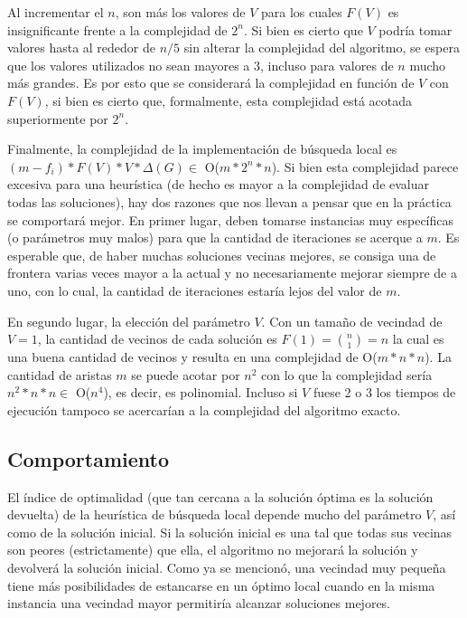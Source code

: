 \par{Al incrementar el $n$, son más los valores de $V$ para los cuales $F(V)$
es insignificante frente a la complejidad de $2^n$. Si bien es cierto que $V$
podría tomar valores hasta al rededor de $n/5$ sin alterar la complejidad del
algoritmo, se espera que los valores utilizados no sean mayores a $3$,
incluso para valores de $n$ mucho más grandes. Es por esto que se considerará
la complejidad en función de $V$ con $F(V)$, si bien es cierto que, formalmente,
esta complejidad está acotada superiormente por $2^n$.}\\
 
\par{Finalmente, la complejidad de la implementación de búsqueda local es\\
$(m-f_i) * F(V) * V*\Delta(G) \in$ O($m*2^n*n$). Si bien esta
complejidad parece excesiva para una heurística (de hecho es mayor a la
complejidad de evaluar todas las soluciones), hay dos razones que nos llevan a
pensar que en la práctica se comportará mejor. En primer lugar, deben tomarse
instancias muy específicas (o parámetros muy malos) para que la cantidad de
iteraciones se acerque a $m$. Es esperable que, de haber muchas soluciones
vecinas mejores, se consiga una de frontera varias
veces mayor a la actual y no necesariamente mejorar siempre de a uno, con
lo cual, la cantidad de iteraciones estaría lejos del valor de $m$.}\\

\par{En segundo lugar, la elección del parámetro $V$.
Con un tamaño de vecindad de $V = 1$, la cantidad de vecinos de cada solución es
$F(1) = \binom{n}{1} = n$ la cual es una buena cantidad de vecinos y
resulta en una complejidad de O($m*n*n$). La cantidad de aristas $m$ se puede
acotar por $n^2$ con lo que la complejidad sería $n^2 * n * n \in$
O($n^4$), es decir, es polinomial. Incluso si $V$ fuese 2 o 3 los tiempos
de ejecución tampoco se acercarían a la complejidad del algoritmo exacto.}

\subsection{Comportamiento}

\par{El índice de optimalidad (que tan cercana a la solución óptima es la
solución devuelta) de la heurística de búsqueda local depende mucho del
parámetro $V$, así como de la solución inicial. Si la solución inicial
es una tal que todas sus vecinas son peores (estrictamente) que ella, el
algoritmo no mejorará la solución y devolverá la solución inicial. Como ya se
mencionó, una vecindad muy pequeña tiene más posibilidades de estancarse en
un óptimo local cuando en la misma instancia una vecindad mayor permitiría
alcanzar soluciones mejores.}\\

